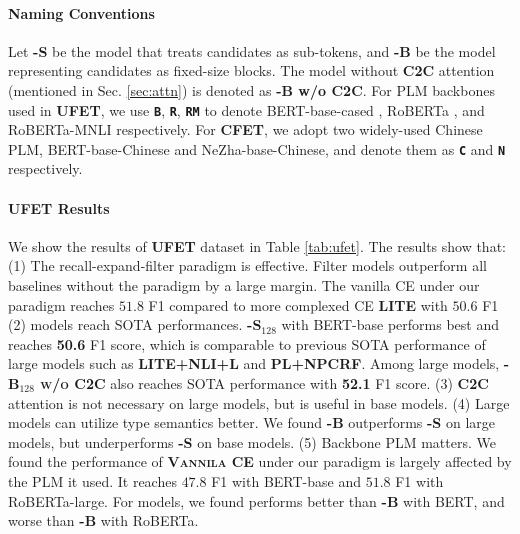 \paragraph{Naming Conventions}
Let {\bf \textsc{\name-S}} be the {\bf \textsc{\name}} model that treats candidates as sub-tokens, and {\bf \textsc{\name-B}} be the model representing candidates as fixed-size blocks. The {\bf \textsc{\name}} model without {\bf \textsc{C2C}} attention (mentioned in Sec. \ref{sec:attn}) is denoted as {\bf \textsc{\name-B} w/o C2C}. For PLM backbones used in {\bf \textsc{UFET}}, we use {\color{blue} \bf \texttt{B}}, {\color{red} \bf \texttt{R}}, {\color{teal} \bf \texttt{RM}} to denote BERT-base-cased \cite{bert}, RoBERTa \cite{liu2019roberta}, and RoBERTa-MNLI \cite{liu2019roberta} respectively. For {\bf \textsc{CFET}}, we adopt two widely-used Chinese PLM, BERT-base-Chinese and NeZha-base-Chinese, and denote them as {\color{brown} \bf \texttt{C}} and {\color{purple} \bf \texttt{N}} respectively. 

\paragraph{UFET Results} We show the results of {\bf \textsc{UFET}} dataset in Table \ref{tab:ufet}. The results show that: (1) The recall-expand-filter paradigm is effective. Filter models outperform all baselines without the paradigm by a large margin. The vanilla CE under our paradigm reaches $51.8$ F1 compared to more complexed CE {\bf \textsc{LITE}} with $50.6$ F1 (2) {\bf \textsc{\name}} models reach SOTA performances. {\bf \textsc{\name-S$_{128}$}} with BERT-base performs best and reaches {\bf 50.6} F1 score, which is comparable to previous SOTA performance of large models such as {\bf \textsc{LITE+NLI+L}} and {\bf \textsc{PL+NPCRF}}. Among large models, {\bf \textsc{\name-B$_{128}$ w/o C2C}} also reaches SOTA performance with {\bf 52.1} F1 score. (3) {\bf \textsc{C2C}} attention is not necessary on large models, but is useful in base models. (4) Large models can utilize type semantics better. We found {\bf \textsc{\name-B}} outperforms {\bf \textsc{\name-S}} on large models, but underperforms {\bf \textsc{\name-S}} on base models. (5) Backbone PLM matters. We found the performance of {\bf \textsc{Vannila CE}} under our paradigm is largely affected by the PLM it used. It reaches $47.8$ F1 with BERT-base and $51.8$ F1 with RoBERTa-large. For {\bf \textsc{\name}} models, we found {\bf \textsc{\name}} performs better than {\bf \textsc{\name-B}} with BERT, and worse than {\bf \textsc{\name-B}} with RoBERTa. 

